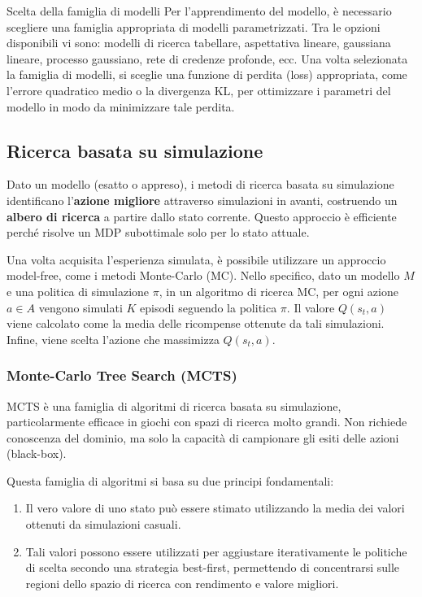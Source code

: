 \begin{nota}{Scelta della famiglia di modelli}{}
Per l'apprendimento del modello, è necessario scegliere una famiglia
appropriata di modelli parametrizzati. Tra le opzioni disponibili vi sono:
modelli di ricerca tabellare, aspettativa lineare, gaussiana lineare,
processo gaussiano, rete di credenze profonde, ecc.
Una volta selezionata la famiglia di modelli, si sceglie una funzione di
perdita (loss) appropriata, come l'errore quadratico medio o la divergenza KL,
per ottimizzare i parametri del modello in modo da minimizzare tale perdita.
\end{nota}

\subsection{Ricerca basata su simulazione}

Dato un modello (esatto o appreso), i metodi di ricerca basata su simulazione
identificano l'\textbf{azione migliore} attraverso simulazioni in avanti, costruendo
un \textbf{albero di ricerca} a partire dallo stato corrente.
Questo approccio è efficiente perché risolve un MDP subottimale solo per
lo stato attuale.

Una volta acquisita l'esperienza simulata, è possibile utilizzare un
approccio model-free, come i metodi Monte-Carlo (MC).
Nello specifico, dato un modello $M$ e una politica di simulazione $\pi$,
in un algoritmo di ricerca MC, per ogni azione $a \in A$ vengono simulati
$K$ episodi seguendo la politica $\pi$.
Il valore $Q(s_t, a)$ viene calcolato come la media delle ricompense ottenute
da tali simulazioni. Infine, viene scelta l'azione che massimizza $Q(s_t, a)$.

\subsubsection{Monte-Carlo Tree Search (MCTS)}

MCTS è una famiglia di algoritmi di ricerca basata su simulazione,
particolarmente efficace in giochi con spazi di ricerca molto grandi.
Non richiede conoscenza del dominio, ma solo la capacità di campionare gli
esiti delle azioni (black-box).

Questa famiglia di algoritmi si basa su due principi fondamentali:
\begin{enumerate}
    \item Il vero valore di uno stato può essere stimato utilizzando la media
    dei valori ottenuti da simulazioni casuali.
    \item Tali valori possono essere utilizzati per aggiustare iterativamente
    le politiche di scelta secondo una strategia best-first, permettendo di
    concentrarsi sulle regioni dello spazio di ricerca con rendimento e valore
    migliori.
\end{enumerate}

